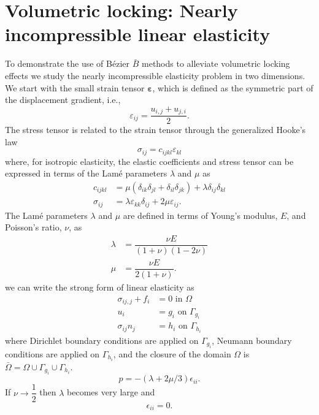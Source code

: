 \documentclass{article}
\newcommand{\Bezier}{{B\'{e}zier} }
\begin{document}
\section{Volumetric locking: Nearly incompressible linear elasticity}
\label{sec:nearlyincompressible}
To demonstrate the use of \Bezier $\bar{B}$ {methods} to alleviate volumetric locking effects we study the nearly incompressible elasticity problem in two dimensions. We start with the small strain tensor $\boldsymbol{\varepsilon}$, which is defined as the symmetric part of the displacement gradient, i.e., 
\begin{equation}
\varepsilon_{ij}=\dfrac{u_{i,j}+u_{j,i}}{2}.
\end{equation}
The stress tensor is related to the strain tensor through the generalized Hooke's law
\begin{equation}
\sigma_{ij}=c_{ijkl}\varepsilon_{kl}
\end{equation}
where, for isotropic elasticity, the elastic coefficients and stress tensor can be expressed in terms of the Lam\'{e} parameters $\lambda$ and $\mu$ as
\begin{align}
c_{ijkl} &=\mu(\delta_{ik}\delta_{jl}+\delta_{il}\delta_{jk})+\lambda\delta_{ij}\delta_{kl}\\
\sigma_{ij} &= \lambda\varepsilon_{kk}\delta_{ij} + 2\mu\varepsilon_{ij}.
\end{align}
The Lam\'e parameters $\lambda$ and $\mu$ are defined in terms of Young's modulus, $E$, and Poisson's ratio, $\nu$, as
\begin{align}
\lambda &=\dfrac{\nu{E}}{(1+\nu)(1-2\nu)}\\
\mu &=\dfrac{\nu{E}}{2(1+\nu)}.
\end{align}
we can write the strong form of linear elasticity as
\begin{align}
	\sigma_{ij,j}+f_i &= 0 \text{ in $\Omega$} \\
    u_i &= g_i\text{ on $\Gamma_{g_i}$} \\
    \sigma_{ij}n_j &= h_i\text{ on $\Gamma_{h_i}$}
\end{align}
where Dirichlet boundary conditions are applied on $\Gamma_{g_i}$, Neumann boundary conditions are applied on $\Gamma_{h_i}$, and the closure of the domain $\Omega$ is $\bar{\Omega}=\Omega\cup\Gamma_{g_i}\cup\Gamma_{h_i}$. 
\begin{equation}
    p=-(\lambda+2\mu/3){\epsilon}_{ii}.
\end{equation}
If $\nu\rightarrow\dfrac{1}{2}$ then $\lambda$ becomes very large and 
\begin{equation}
    {\epsilon}_{ii}=0.
\end{equation}
\end{document}
